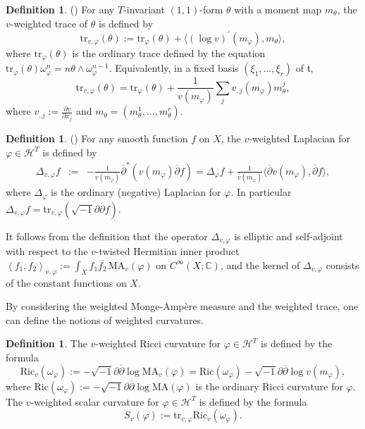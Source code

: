 \documentclass[12pt]{amsart}
\numberwithin{equation}{section}%
\theoremstyle{plain}
\theoremstyle{definition}
\newtheorem{definition}[theorem]{Definition}
\newcommand{\deldel}{\sqrt{-1}\partial \overline{\partial}}
\newcommand{\tr}{\mathrm{tr}}
\newcommand{\Ric}{\mathrm{Ric}}
\newcommand{\MA}{\mathrm{MA}}
\renewcommand{\phi}{\varphi}
\newcommand{\ip}[1]{\left\langle#1\right\rangle}
\newcommand{\1}{\mathbf{1}}
\begin{document}
\begin{definition}(\cite[Appendix A]{DJL24})
For any $T$-invariant $(1,1)$-form $\theta$ with a moment map
$m_{\theta}$, the $v$-weighted trace of $\theta$ is defined by
\begin{equation}
\tr_{v,\phi}(\theta):=\tr_{\phi}(\theta)
+\langle (\log v)^{\prime}(m_{\phi}),m_{\theta}\rangle,
\end{equation}
where $\tr_{\phi}(\theta)$ is the ordinary trace defined by the equation
$\tr_{\phi}(\theta)\omega_{\phi}^{n}=n\theta\wedge\omega_{\phi}^{n-1}$.
Equivalently, in a fixed basis $(\xi_{1},\dots,\xi_{r})$ of $\mathfrak{t}$,
\begin{equation}
\tr_{v,\phi}(\theta)=\tr_{\phi}(\theta)+
\frac{1}{v(m_{\phi})}\sum_{j}v_{, j}(m_{\phi})m^{j}_{\theta},
\end{equation}
where $v_{, j}:=\frac{\partial v}{\partial x_{j}}$ and
$m_{\theta}=(m_{\theta}^{1},\dots,m_{\theta}^{r}).$
\end{definition}

\begin{definition}(\cite[Appendix A]{DJL24})
For any smooth function $f$ on $X$, the $v$-weighted Laplacian
for $\phi\in\mathcal{H}^{T}$ is defined by
\begin{eqnarray}
\Delta_{v,\phi}f&:=&-\frac{1}{v(m_{\phi})}
\overline{\partial}^{*}(v(m_{\phi})\overline{\partial}f)
= \Delta_{\phi} f +\frac{1}{v(m_{\phi})}
\langle\overline{\partial}v(m_{\phi}),\overline{\partial}f\rangle,
\end{eqnarray}
where $\Delta_{\phi}$ is the ordinary (negative) Laplacian for $\phi$.
In particular $\Delta_{v,\phi}f=\tr_{v,\phi}(\deldel f)$.
\end{definition}

It follows from the definition that
the operator $\Delta_{v,\phi}$ is elliptic and 
self-adjoint with respect to
the $v$-twisted Hermitian inner product
$\ip{f_{1}, f_{2}}_{v, \phi}:=\int_{X}f_{1}\overline{f_{2}}\,\MA_{v}(\phi)$
on $C^{\infty}(X;\mathbb{C})$,
and the kernel of $\Delta_{v,\phi}$ consists of the constant functions on $X$.


By considering the weighted Monge-Amp\`ere measure and
the weighted trace, one can define the notions of weighted curvatures.

\begin{definition}
The $v$-weighted Ricci curvature for $\phi\in\mathcal{H}^{T}$ is defined by
the formula
\begin{equation}
\Ric_{v}(\omega_{\phi}):=-\deldel\log\MA_{v}(\phi)
=\Ric(\omega_{\phi})-\deldel\log v(m_{\phi}),
\end{equation}
where $\Ric(\omega_{\phi}):=-\deldel\log\MA(\phi)$
is the ordinary Ricci curvature for $\phi$.
The $v$-weighted scalar curvature for $\phi\in\mathcal{H}^{T}$ is defined by
the formula
\begin{equation}
S_{v}(\phi):=\tr_{v,\phi}\Ric_{v}(\omega_{\phi}).
\end{equation}
\end{definition}
\end{document}
